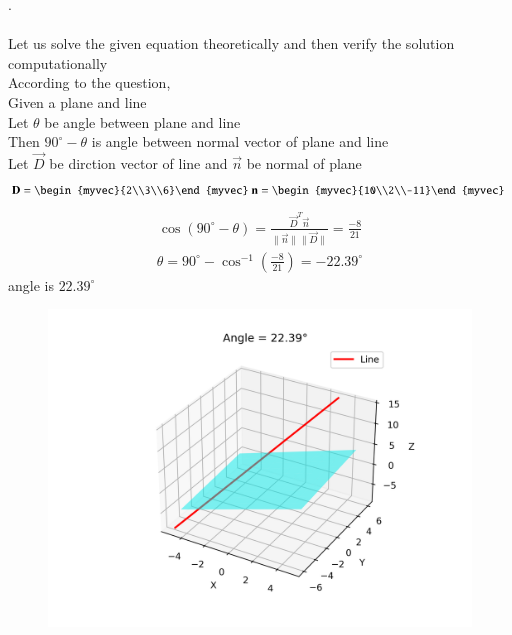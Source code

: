 \documentclass[journal]{IEEEtran}
\begin{document}
.\\
\solution \\
Let us solve the given equation theoretically and then verify the solution computationally \\
According to the question, \\
Given a plane and line\\
Let $\theta$ be angle between plane and line\\
Then $90^\circ-\theta$ is angle between normal vector of plane and line\\
Let $\vec{D}$ be dirction vector of line and $\vec{n}$ be normal of plane\\
\begin{align}
\vec{D}=\begin{myvec}{2\\3\\6}\end{myvec}\
\vec{n}=\begin{myvec}{10\\2\\-11}\end{myvec}\
\end{align}
\begin{align}
   \cos(90^\circ-\theta)=\frac{\vec{D}^T\vec{n}}{\|\vec{n}\|\|\vec{D}\|}=\frac{-8}{21}
\end{align}
\begin{align}
    \theta=90^\circ-\cos^{-1} (\frac{-8}{21})=-22.39^\circ
\end{align}
angle is $22.39^\circ$
\begin{figure}[h!]
    \centering
    \includegraphics[width=0.8\columnwidth]{figs/line_plane_angle.png}
    \caption{}
    \label{fig:placeholder}
\end{figure}
\end{document}
